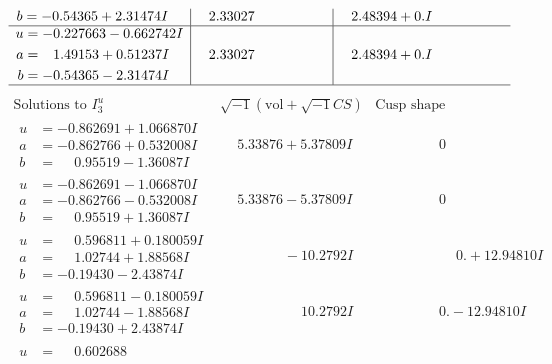 \documentclass[1p]{elsarticle_modified}
\theoremstyle{definition}
\newcommand{\I}{\sqrt{-1}}
\begin{document}
$$\begin{array}{c|c|c}
\begin{aligned}
b &= -0.54365 + 2.31474 I\end{aligned}
 & \phantom{-}2.33027\phantom{ +0.000000I} & \phantom{-}2.48394 + 0. I\phantom{ +0.000000I} \\ \hline\begin{aligned}
u &= -0.227663 - 0.662742 I \\
a &= \phantom{-}1.49153 + 0.51237 I \\
b &= -0.54365 - 2.31474 I\end{aligned}
 & \phantom{-}2.33027\phantom{ +0.000000I} & \phantom{-}2.48394 + 0. I\phantom{ +0.000000I}\\
 \hline 
 \end{array}$$\newpage$$\begin{array}{c|c|c}  
\text{Solutions to }I^u_{3}& \I (\text{vol} + \sqrt{-1}CS) & \text{Cusp shape}\\
 \hline 
\begin{aligned}
u &= -0.862691 + 1.066870 I \\
a &= -0.862766 + 0.532008 I \\
b &= \phantom{-}0.95519 - 1.36087 I\end{aligned}
 & \phantom{-}5.33876 + 5.37809 I & \phantom{-0.000000 } 0 \\ \hline\begin{aligned}
u &= -0.862691 - 1.066870 I \\
a &= -0.862766 - 0.532008 I \\
b &= \phantom{-}0.95519 + 1.36087 I\end{aligned}
 & \phantom{-}5.33876 - 5.37809 I & \phantom{-0.000000 } 0 \\ \hline\begin{aligned}
u &= \phantom{-}0.596811 + 0.180059 I \\
a &= \phantom{-}1.02744 + 1.88568 I \\
b &= -0.19430 - 2.43874 I\end{aligned}
 & \phantom{-0.000000 } -10.2792 I & \phantom{-0.000000 -}0. + 12.94810 I \\ \hline\begin{aligned}
u &= \phantom{-}0.596811 - 0.180059 I \\
a &= \phantom{-}1.02744 - 1.88568 I \\
b &= -0.19430 + 2.43874 I\end{aligned}
 & \phantom{-0.000000 -}10.2792 I & \phantom{-0.000000 } 0. - 12.94810 I \\ \hline\begin{aligned}
u &= \phantom{-}0.602688\phantom{ +0.000000I} \\

\end{aligned}
\end{array}$$
\end{document}
